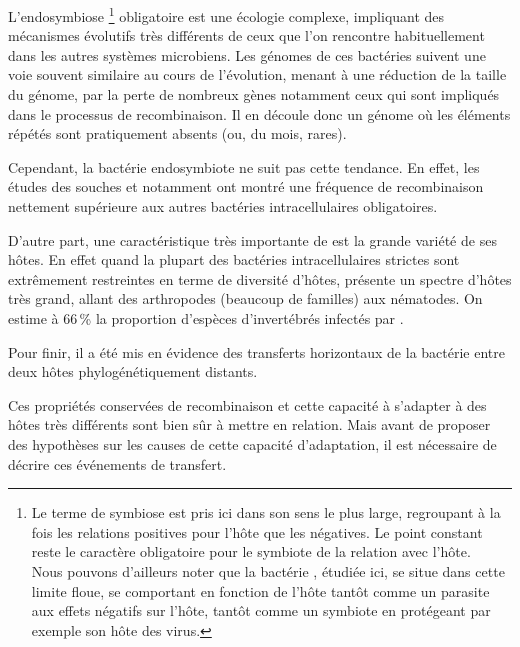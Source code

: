 L'endosymbiose%
\footnote{Le terme de symbiose est pris ici dans son sens le plus large, regroupant à la fois les relations positives pour l'hôte que les négatives. Le point constant reste le caractère obligatoire pour le symbiote de la relation avec l'hôte.\\
Nous pouvons d'ailleurs noter que la bactérie , étudiée ici, se situe dans cette limite floue, se comportant en fonction de l'hôte tantôt comme un parasite aux effets négatifs sur l'hôte\cite{Werren2008}, tantôt comme un symbiote en protégeant par exemple son hôte des virus.}
obligatoire est une écologie complexe, impliquant des mécanismes évolutifs très différents de ceux que l'on rencontre habituellement dans les autres systèmes microbiens.
Les génomes de ces bactéries suivent une voie souvent similaire au cours de l'évolution, menant à une réduction de la taille du génome, par la perte de nombreux gènes\cite{wernegreen2002} notamment ceux qui sont impliqués dans le processus de recombinaison.
Il en découle donc un génome où les éléments répétés sont pratiquement absents (ou, du mois, rares\cite{Bordenstein2005}).

Cependant, la bactérie endosymbiote  ne suit pas cette tendance. En effet, les études des souches  et  notamment ont montré une fréquence de recombinaison nettement supérieure aux autres bactéries intracellulaires obligatoires\cite{Wu2004}.

D'autre part, une caractéristique très importante de  est la grande variété de ses hôtes. En effet quand la plupart des bactéries intracellulaires strictes sont extrêmement restreintes en terme de diversité d'hôtes,  présente un spectre d'hôtes très grand, allant des arthropodes (beaucoup de familles) aux nématodes. On estime à 66\,\% la proportion d'espèces d'invertébrés infectés par \cite{hilgenboecker2008}.

Pour finir, il a été mis en évidence \cite{vavre1999} des transferts horizontaux de la bactérie entre deux hôtes phylogénétiquement distants.

Ces propriétés conservées de recombinaison et cette capacité à s'adapter à des hôtes très différents sont bien sûr à mettre en relation.
Mais avant de proposer des hypothèses sur les causes de cette capacité d'adaptation, il est nécessaire de décrire ces événements de transfert.

